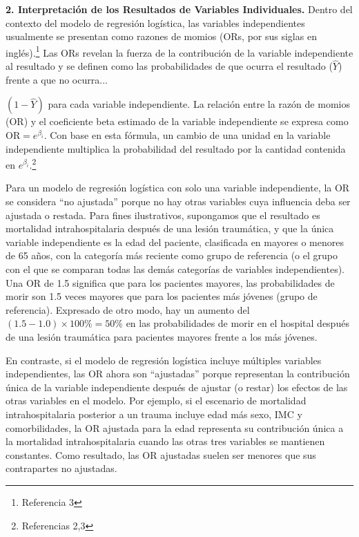 \documentclass[12pt]{article}
\begin{document}
\textbf{2. Interpretaci\'on de los Resultados de Variables Individuales.} Dentro del contexto del modelo de regresi\'on log\'istica, las variables independientes usualmente se presentan como razones de momios (ORs, por sus siglas en ingl\'es).\footnote{Referencia 3} Las ORs revelan la fuerza de la contribuci\'on de la variable independiente al resultado y se definen como las probabilidades de que ocurra el resultado ($\hat{Y}$) frente a que no ocurra...

\noindent
$(1 - \hat{Y})$ para cada variable independiente. La relaci\'on entre la raz\'on de momios (OR) y el coeficiente beta estimado de la variable independiente se expresa como $\text{OR} = e^{\beta_i}$. Con base en esta f\'ormula, un cambio de una unidad en la variable independiente multiplica la probabilidad del resultado por la cantidad contenida en $e^{\beta_i}$.\footnote{Referencias 2,3}

Para un modelo de regresi\'on log\'istica con solo una variable independiente, la OR se considera ``no ajustada'' porque no hay otras variables cuya influencia deba ser ajustada o restada. Para fines ilustrativos, supongamos que el resultado es mortalidad intrahospitalaria despu\'es de una lesi\'on traum\'atica, y que la \'unica variable independiente es la edad del paciente, clasificada en mayores o menores de 65 a\~nos, con la categor\'ia m\'as reciente como grupo de referencia (o el grupo con el que se comparan todas las dem\'as categor\'ias de variables independientes). Una OR de 1.5 significa que para los pacientes mayores, las probabilidades de morir son 1.5 veces mayores que para los pacientes m\'as j\'ovenes (grupo de referencia). Expresado de otro modo, hay un aumento del $(1.5 - 1.0) \times 100\% = 50\%$ en las probabilidades de morir en el hospital despu\'es de una lesi\'on traum\'atica para pacientes mayores frente a los m\'as j\'ovenes.

En contraste, si el modelo de regresi\'on log\'istica incluye m\'ultiples variables independientes, las OR ahora son ``ajustadas'' porque representan la contribuci\'on \'unica de la variable independiente despu\'es de ajustar (o restar) los efectos de las otras variables en el modelo. Por ejemplo, si el escenario de mortalidad intrahospitalaria posterior a un trauma incluye edad m\'as sexo, IMC y comorbilidades, la OR ajustada para la edad representa su contribuci\'on \'unica a la mortalidad intrahospitalaria cuando las otras tres variables se mantienen constantes. Como resultado, las OR ajustadas suelen ser menores que sus contrapartes no ajustadas.
\end{document}
